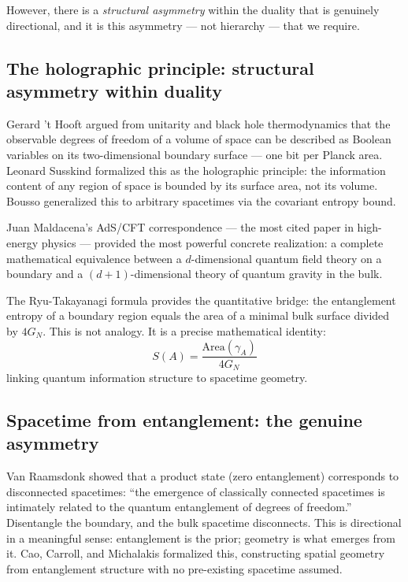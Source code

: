 \documentclass[12pt, a4paper]{article}
\begin{document}
However, there is a \textit{structural asymmetry} within the duality that is genuinely
directional, and it is this asymmetry --- not hierarchy --- that we require.

\subsection{The holographic principle: structural asymmetry within duality}

Gerard 't Hooft \citep{thooft1993} argued from unitarity and black hole thermodynamics that
the observable degrees of freedom of a volume of space can be described as Boolean variables
on its two-dimensional boundary surface --- one bit per Planck area. Leonard Susskind
\citep{susskind1995} formalized this as the holographic principle: the information content of
any region of space is bounded by its surface area, not its volume. Bousso \citep{bousso2002}
generalized this to arbitrary spacetimes via the covariant entropy bound.

Juan Maldacena's AdS/CFT correspondence \citep{maldacena1998} --- the most cited paper in
high-energy physics --- provided the most powerful concrete realization: a complete
mathematical equivalence between a $d$-dimensional quantum field theory on a boundary and a
$(d+1)$-dimensional theory of quantum gravity in the bulk.

The Ryu-Takayanagi formula \citep{ryu2006} provides the quantitative bridge: the
entanglement entropy of a boundary region equals the area of a minimal bulk surface divided
by $4G_N$. This is not analogy. It is a precise mathematical identity:
\[
S(A) = \frac{\mathrm{Area}(\gamma_A)}{4G_N}
\]
linking quantum information structure to spacetime geometry.

\subsection{Spacetime from entanglement: the genuine asymmetry}

Van Raamsdonk \citep{vanraamsdonk2010} showed that a product state (zero entanglement)
corresponds to disconnected spacetimes: ``the emergence of classically connected spacetimes
is intimately related to the quantum entanglement of degrees of freedom.'' Disentangle the
boundary, and the bulk spacetime disconnects. This is directional in a meaningful sense:
entanglement is the prior; geometry is what emerges from it. Cao, Carroll, and Michalakis
\citep{cao2017} formalized this, constructing spatial geometry from entanglement structure
with no pre-existing spacetime assumed.
\end{document}
